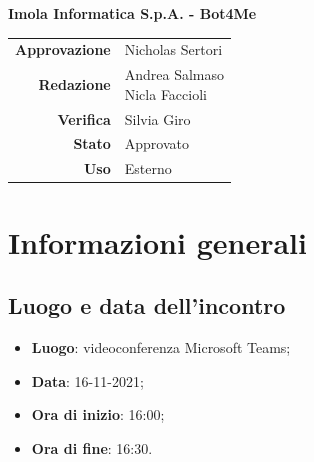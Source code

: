 \documentclass[11pt]{article}
\begin{document}
\begin{titlepage}
\begin{center}
			\large
			\textbf{Imola Informatica S.p.A. - Bot4Me}\\
			
			\vfill
			
			\begin{tabular}{r|l}
				\textbf{Approvazione} &  Nicholas Sertori\\
				\textbf{Redazione} &  \parbox[t]{3.5cm}{Andrea Salmaso \\Nicla Faccioli}\\
				\textbf{Verifica} &  Silvia Giro\\
				\textbf{Stato} & Approvato \\
				\textbf{Uso} & Esterno
			\end{tabular}
			\vfill
			
		\end{center}
	\end{titlepage}

	\newpage

	\section{Informazioni generali}
	\subsection{Luogo e data dell'incontro}
	\begin{itemize}
		\item \textbf{Luogo}: videoconferenza Microsoft Teams;
		\item \textbf{Data}: 16-11-2021;
		\item \textbf{Ora di inizio}: 16:00;
		\item \textbf{Ora di fine}: 16:30.
	\end{itemize}
	
\end{document}
